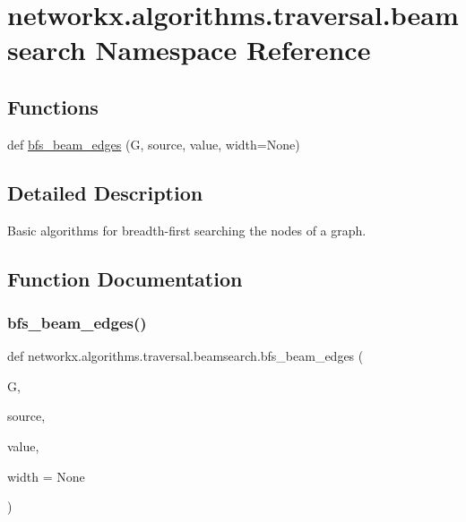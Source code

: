 \hypertarget{namespacenetworkx_1_1algorithms_1_1traversal_1_1beamsearch}{}\section{networkx.\+algorithms.\+traversal.\+beamsearch Namespace Reference}
\label{namespacenetworkx_1_1algorithms_1_1traversal_1_1beamsearch}
\subsection*{Functions}
\begin{DoxyCompactItemize}
\item 
def \hyperlink{namespacenetworkx_1_1algorithms_1_1traversal_1_1beamsearch_a87cb67ee426d9c83e49658b4b6598c6b}{bfs\+\_\+beam\+\_\+edges} (G, source, value, width=None)
\end{DoxyCompactItemize}


\subsection{Detailed Description}
\begin{DoxyVerb}Basic algorithms for breadth-first searching the nodes of a graph.\end{DoxyVerb}
 

\subsection{Function Documentation}
\mbox{\label{namespacenetworkx_1_1algorithms_1_1traversal_1_1beamsearch_a87cb67ee426d9c83e49658b4b6598c6b}} 
\subsubsection{\texorpdfstring{bfs\+\_\+beam\+\_\+edges()}{bfs\_beam\_edges()}}
{\footnotesize\ttfamily def networkx.\+algorithms.\+traversal.\+beamsearch.\+bfs\+\_\+beam\+\_\+edges (\begin{DoxyParamCaption}\item[{}]{G,  }\item[{}]{source,  }\item[{}]{value,  }\item[{}]{width = {\ttfamily None} }\end{DoxyParamCaption})}

